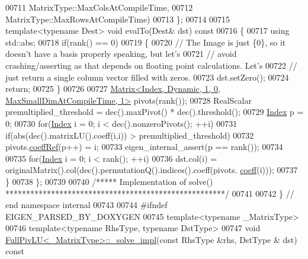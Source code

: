 \begin{DoxyCode}
00711             MatrixType::MaxColsAtCompileTime,
00712             MatrixType::MaxRowsAtCompileTime)
00713   \};
00714 
00715   \textcolor{keyword}{template}<\textcolor{keyword}{typename} Dest> \textcolor{keywordtype}{void} evalTo(Dest& dst)\textcolor{keyword}{ const}
00716 \textcolor{keyword}{  }\{
00717     \textcolor{keyword}{using} std::abs;
00718     \textcolor{keywordflow}{if}(rank() == 0)
00719     \{
00720       \textcolor{comment}{// The Image is just \{0\}, so it doesn't have a basis properly speaking, but let's}
00721       \textcolor{comment}{// avoid crashing/asserting as that depends on floating point calculations. Let's}
00722       \textcolor{comment}{// just return a single column vector filled with zeros.}
00723       dst.setZero();
00724       \textcolor{keywordflow}{return};
00725     \}
00726 
00727     \hyperlink{group___core___module_class_eigen_1_1_matrix}{Matrix<Index, Dynamic, 1, 0, MaxSmallDimAtCompileTime, 1>}
       pivots(rank());
00728     RealScalar premultiplied\_threshold = dec().maxPivot() * dec().threshold();
00729     \hyperlink{group___core___module_a554f30542cc2316add4b1ea0a492ff02}{Index} p = 0;
00730     \textcolor{keywordflow}{for}(\hyperlink{group___core___module_a554f30542cc2316add4b1ea0a492ff02}{Index} i = 0; i < dec().nonzeroPivots(); ++i)
00731       \textcolor{keywordflow}{if}(abs(dec().matrixLU().coeff(i,i)) > premultiplied\_threshold)
00732         pivots.\hyperlink{class_eigen_1_1_plain_object_base_a25626a55b26a4323565f79d1b7c48ea8}{coeffRef}(p++) = i;
00733     eigen\_internal\_assert(p == rank());
00734 
00735     \textcolor{keywordflow}{for}(\hyperlink{group___core___module_a554f30542cc2316add4b1ea0a492ff02}{Index} i = 0; i < rank(); ++i)
00736       dst.col(i) = originalMatrix().col(dec().permutationQ().indices().coeff(pivots.
      \hyperlink{class_eigen_1_1_plain_object_base_afbfc12954f16d21aedb7bd839f64a278}{coeff}(i)));
00737   \}
00738 \};
00739 
00740 \textcolor{comment}{/***** Implementation of solve() *****************************************************/}
00741 
00742 \} \textcolor{comment}{// end namespace internal}
00743 
00744 \textcolor{preprocessor}{#ifndef EIGEN\_PARSED\_BY\_DOXYGEN}
00745 \textcolor{keyword}{template}<\textcolor{keyword}{typename} \_MatrixType>
00746 \textcolor{keyword}{template}<\textcolor{keyword}{typename} RhsType, \textcolor{keyword}{typename} DstType>
00747 \textcolor{keywordtype}{void} \hyperlink{group___l_u___module_class_eigen_1_1_full_piv_l_u}{FullPivLU<\_MatrixType>::\_solve\_impl}(\textcolor{keyword}{const} RhsType &rhs, DstType &
      dst)\textcolor{keyword}{ const}

\end{DoxyCode}
